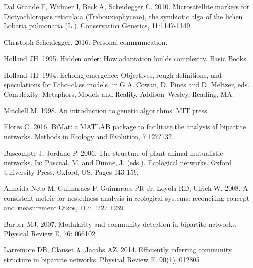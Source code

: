 \documentclass[runningheads,a4paper]{llncs}
\begin{document}
Dal Grande F, Widmer I, Beck A, Scheidegger C. 2010. Microsatellite markers for Dictyochloropsis reticulata (Trebouxiophyceae), the symbiotic alga of the lichen Lobaria pulmonaria (L.). Conservation Genetics, 11:1147-1149. 

Christoph Scheidegger. 2016. Personal communication. 

Holland JH. 1995. Hidden order: How adaptation builds complexity. Basic Books

Holland JH. 1994. Echoing emergence: Objectives, rough definitions, and speculations for Echo--class models. in G.A. Cowan, D. Pines and D. Meltzer, eds. Complexity: Metaphors, Models and Reality. Addison--Wesley, Reading, MA.

Mitchell M. 1998. An introduction to genetic algorithms. MIT press

Flores C. 2016. BiMat: a MATLAB package to facilitate the analysis of bipartite networks. Methods in Ecology and Evolution, 7:127?132.  

Bascompte J, Jordano P. 2006. The structure of plant-animal mutualistic networks. In: Pascual, M. and Dunne, J. (eds.). Ecological networks. Oxford University Press, Oxford, US. Pages 143-159. 

Almeida-Neto M, Guimaraes P, Guimaraes PR Jr, Loyola RD, Ulrich W. 2008. A consistent metric for nestedness analysis in ecological systems: reconciling concept and measurement Oikos, 117: 1227 1239

Barber MJ. 2007. Modularity and community detection in bipartite networks. Physical Review E, 76: 066102

Larremore DB, Clauset A, Jacobs AZ. 2014. Efficiently inferring community structure in bipartite networks. Physical Review E, 90(1), 012805
\end{document}
